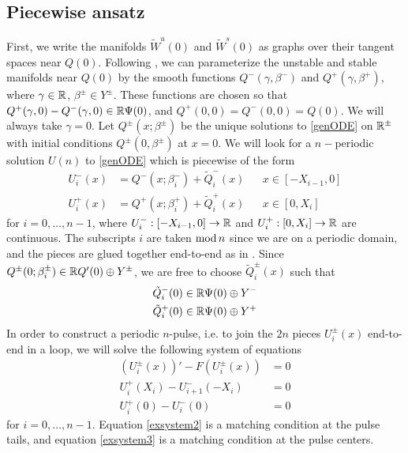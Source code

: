 \documentclass[10pt,reqno]{amsart}
\theoremstyle{plain}
\theoremstyle{definition}
\theoremstyle{remark}
\numberwithin{theorem}{section}
\numberwithin{equation}{section}
\begin{document}
\subsection{Piecewise ansatz}

First, we write the manifolds $\tilde{W}^u(0)$ and $\tilde{W}^s(0)$ as graphs over their tangent spaces near $Q(0)$. Following \cite{Sandstede1997}, we can parameterize the unstable and stable manifolds near $Q(0)$ by the smooth functions $Q^-(\gamma, \beta^-)$ and $Q^+(\gamma, \beta^+)$, where $\gamma \in \mathbb{R}$, $\beta^\pm \in Y^\pm$. These functions are chosen so that $Q^+(\gamma, 0) - Q^-(\gamma, 0) \in \mathbb{R} \Psi(0)$, and $Q^+(0, 0) = Q^-(0, 0) = Q(0)$. We will always take $\gamma = 0$. Let $Q^\pm(x; \beta^\pm)$ be the unique solutions to \eqref{genODE} on $\mathbb{R}^\pm$ with initial conditions $Q^\pm(0, \beta^\pm)$ at $x = 0$. We will look for a $n-$periodic solution $U(n)$ to \eqref{genODE} which is piecewise of the form
\begin{equation}\label{Upiecewise}
\begin{aligned}
U_i^-(x) &= Q^-(x; \beta_i^-) + \tilde{Q}_i^-(x) && x \in [-X_{i-1}, 0] \\
U_i^+(x) &= Q^+(x; \beta_i^+) + \tilde{Q}_i^+(x) && x \in [0, X_i]
\end{aligned}
\end{equation}
for $i = 0, \dots, n-1$, where $U_i^-: [-X_{i-1}, 0] \rightarrow \mathbb{R}$ and $U_i^+: [0, X_i] \rightarrow \mathbb{R}$ are continuous. The subscripts $i$ are taken $\mathop\mathrm{mod}\nolimits n$ since we are on a periodic domain, and the pieces are glued together end-to-end as in \cite{Sandstede1998} 
. Since $Q^\pm(0; \beta_i^\pm) \in \mathbb{R} Q'(0) \oplus Y^\pm$, we are free to choose $\tilde{Q}_i^\pm(x)$ such that
\begin{align*}
\tilde{Q}_i^-(0) &\in \mathbb{R} \Psi(0) \oplus Y^- \\
\tilde{Q}_i^+(0) &\in \mathbb{R} \Psi(0) \oplus Y^+
\end{align*}
In order to construct a periodic $n$-pulse, i.e. to join the $2n$ pieces $U_i^\pm(x)$ end-to-end in a loop, we will solve the following system of equations
\begin{align}
(U_i^\pm(x))' - F(U_i^\pm(x)) &= 0 \label{exsystem1} \\
U_i^+(X_i) - U_{i+1}^-(-X_i) &= 0 \label{exsystem2} \\
U_i^+(0) - U_i^-(0) &= 0 \label{exsystem3}
\end{align}
for $i = 0, \dots, n-1$. Equation \cref{exsystem2} is a matching condition at the pulse tails, and equation \cref{exsystem3} is a matching condition at the pulse centers.
\end{document}
